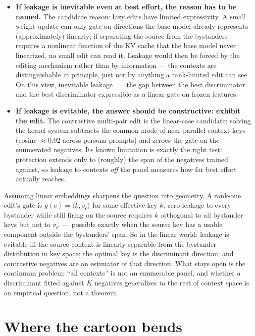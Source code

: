 \documentclass[11pt]{article}
\newcommand{\vc}{v_c}
\begin{document}
\begin{itemize}
\item \textbf{If leakage is inevitable even at best effort, the reason has to be named.} The candidate reason: lazy edits have limited expressivity. A small weight update can only gate on directions the base model already represents (approximately) linearly; if separating the source from the bystanders requires a nonlinear function of the KV cache that the base model never linearized, no small edit can read it. Leakage would then be forced by the editing mechanism rather than by information --- the contexts are distinguishable in principle, just not by anything a rank-limited edit can see. On this view, inevitable leakage $=$ the gap between the best discriminator and the best discriminator expressible as a linear gate on frozen features.
\item \textbf{If leakage is evitable, the answer should be constructive: exhibit the edit.} The contrastive multi-pair edit is the linear-case candidate: solving the kernel system subtracts the common mode of near-parallel context keys (cosine $\approx 0.92$ across persona prompts) and zeroes the gate on the enumerated negatives. Its known limitation is exactly the right test: protection extends only to (roughly) the span of the negatives trained against, so leakage to contexts \emph{off} the panel measures how far best effort actually reaches.
\end{itemize}

Assuming linear embeddings sharpens the question into geometry. A rank-one edit's gate is $g(c) = \langle k, \vc \rangle$ for some effective key $k$; zero leakage to every bystander while still firing on the source requires $k$ orthogonal to all bystander keys but not to $v_{c'}$ --- possible exactly when the source key has a usable component outside the bystanders' span. So in the linear world: leakage is evitable iff the source context is linearly separable from the bystander distribution in key space; the optimal key is the discriminant direction; and contrastive negatives are an estimator of that direction. What stays open is the continuum problem: ``all contexts'' is not an enumerable panel, and whether a discriminant fitted against $K$ negatives generalizes to the rest of context space is an empirical question, not a theorem.

\section{Where the cartoon bends}
\end{document}
